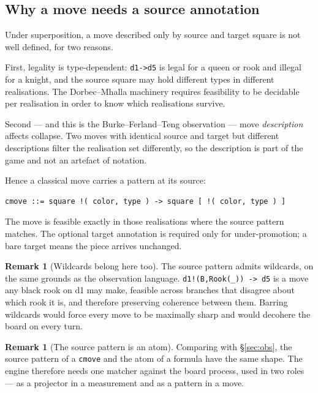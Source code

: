 \documentclass[11pt,a4paper]{article}
\theoremstyle{definition}
\newtheorem{remark}[definition]{Remark}
\theoremstyle{plain}
\begin{document}
\subsection{Why a move needs a source annotation}

Under superposition, a move described only by source and target square is not
well defined, for two reasons.

First, legality is type-dependent: \texttt{d1->d5} is legal for a queen or rook
and illegal for a knight, and the source square may hold different types in
different realisations. The Dorbec--Mhalla machinery requires feasibility to be
decidable per realisation in order to know which realisations survive.

Second --- and this is the Burke--Ferland--Teng observation --- move
\emph{description} affects collapse. Two moves with identical source and target
but different descriptions filter the realisation set differently, so the
description is part of the game and not an artefact of notation.

Hence a classical move carries a pattern at its source:

\begin{lstlisting}
cmove ::= square !( color, type ) -> square [ !( color, type ) ]
\end{lstlisting}

The move is feasible exactly in those realisations where the source pattern
matches. The optional target annotation is required only for under-promotion; a
bare target means the piece arrives unchanged.

\begin{remark}[Wildcards belong here too]
The source pattern admits wildcards, on the same grounds as the observation
language. \texttt{d1!(B,Rook(\_)) -> d5} is a move any black rook on d1 may
make, feasible across branches that disagree about which rook it is, and
therefore preserving coherence between them. Barring wildcards would force
every move to be maximally sharp and would decohere the board on every turn.
\end{remark}

\begin{remark}[The source pattern is an atom]
Comparing with \S\ref{sec:obs}, the source pattern of a \texttt{cmove} and the
atom of a formula have the same shape. The engine therefore needs one matcher
against the board process, used in two roles --- as a projector in a
measurement and as a pattern in a move.
\end{remark}
\end{document}
